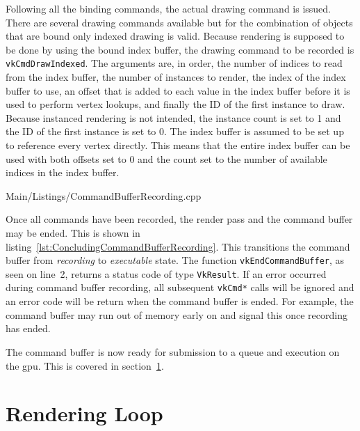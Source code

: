       Following all the binding commands, the actual drawing command is issued.
      There are several drawing commands available but for the combination of objects that are bound only indexed drawing is valid.
      Because rendering is supposed to be done by using the bound index buffer, the drawing command to be recorded is \lstinline{vkCmdDrawIndexed}.
      The arguments are, in order, the number of indices to read from the index buffer, the number of instances to render, the index of the index buffer to use, an offset that is added to each value in the index buffer before it is used to perform vertex lookups, and finally the ID of the first instance to draw.
      Because instanced rendering is not intended, the instance count is set to 1 and the ID of the first instance is set to 0.
      The index buffer is assumed to be set up to reference every vertex directly.
      This means that the entire index buffer can be used with both offsets set to 0 and the count set to the number of available indices in the index buffer.

      
      {Main/Listings/CommandBufferRecording.cpp}

      Once all commands have been recorded, the render pass and the command buffer may be ended.
      This is shown in listing~\ref{lst:ConcludingCommandBufferRecording}.
      This transitions the command buffer from \textit{recording} to \textit{executable} state.
      The function \lstinline{vkEndCommandBuffer}, as seen on line~2, returns a status code of type \lstinline{VkResult}.
      If an error occurred during command buffer recording, all subsequent \lstinline{vkCmd*} calls will be ignored and an error code will be return when the command buffer is ended.
      For example, the command buffer may run out of memory early on and signal this once recording has ended.

      The command buffer is now ready for submission to a queue and execution on the \gls{gpu}.
      This is covered in section~\ref{sec:RenderLoop}.


  \section{Rendering Loop}
  \label{sec:RenderLoop}
    \tbd

